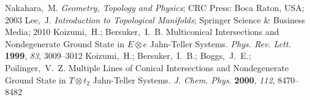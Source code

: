 \documentclass[superscriptaddress,showpacs,amsmath,amssymb,pra,twocolumn]{revtex4-1}
\begin{document}
\begin{thebibliography}{61}
\mciteBstWouldAddEndPuncttrue
\mciteSetBstMidEndSepPunct{\mcitedefaultmidpunct}
{\mcitedefaultendpunct}{\mcitedefaultseppunct}\relax
\EndOfBibitem
{}
Nakahara,~M. \emph{Geometry, Topology and Physics}; {CRC Press: Boca Raton, USA}; 2003\relax
\mciteBstWouldAddEndPuncttrue
\mciteSetBstMidEndSepPunct{\mcitedefaultmidpunct}
{\mcitedefaultendpunct}{\mcitedefaultseppunct}\relax
\EndOfBibitem
{}
Lee,~J. \emph{Introduction to Topological Manifolds}; {Springer Science \&
  Business Media}; 2010\relax
\mciteBstWouldAddEndPuncttrue
\mciteSetBstMidEndSepPunct{\mcitedefaultmidpunct}
{\mcitedefaultendpunct}{\mcitedefaultseppunct}\relax
\EndOfBibitem
{}
Koizumi,~H.; Bersuker,~I.~B. Multiconical {{Intersections}} and {{Nondegenerate
  Ground State}} in
$E\otimes e$
 Jahn-Teller Systems. \emph{Phys. Rev. Lett.} \textbf{1999},
  \emph{83}, 3009--3012\relax
\mciteBstWouldAddEndPuncttrue
\mciteSetBstMidEndSepPunct{\mcitedefaultmidpunct}
{\mcitedefaultendpunct}{\mcitedefaultseppunct}\relax
\EndOfBibitem
{}
Koizumi,~H.; Bersuker,~I.~B.; Boggs,~J.~E.; Poilinger,~V.~Z. Multiple Lines of
  Conical Intersections and Nondegenerate Ground State in $T \otimes t_2$
  Jahn-Teller Systems. \emph{J. Chem. Phys.}
  \textbf{2000}, \emph{112}, 8470--8482\relax
\mciteBstWouldAddEndPuncttrue
\mciteSetBstMidEndSepPunct{\mcitedefaultmidpunct}
{\mcitedefaultendpunct}{\mcitedefaultseppunct}\relax
\EndOfBibitem
\end{thebibliography}
\end{document}
